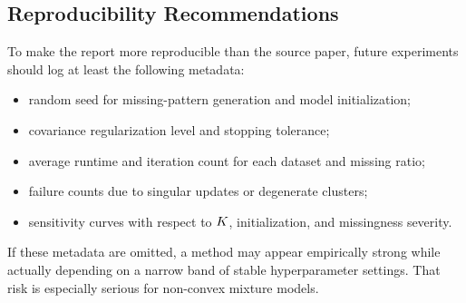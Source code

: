 \subsection{Reproducibility Recommendations}
To make the report more reproducible than the source paper, future experiments should log at least the following metadata:
\begin{itemize}
    \item random seed for missing-pattern generation and model initialization;
    \item covariance regularization level and stopping tolerance;
    \item average runtime and iteration count for each dataset and missing ratio;
    \item failure counts due to singular updates or degenerate clusters;
    \item sensitivity curves with respect to $K$, initialization, and missingness severity.
\end{itemize}

\begin{remark}
If these metadata are omitted, a method may appear empirically strong while actually depending on a narrow band of stable hyperparameter settings. That risk is especially serious for non-convex mixture models.
\end{remark}
